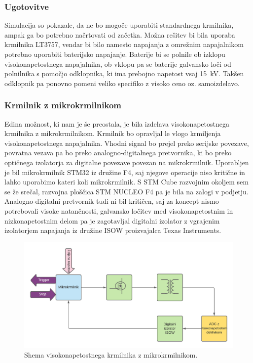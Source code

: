 \documentclass[a4paper,twoside,openright,12pt,Slovene]{book}
\begin{document}
    \subsubsection{Ugotovitve} \label{Ugotovitve glede komercialnih krmilnkov}
Simulacija so pokazale, da ne bo mogoče uporabiti standardnega krmilnika, ampak ga bo potrebno načrtovati od začetka. Možna rešitev bi bila uporaba krmilnika LT3757, vendar bi bilo namesto napajanja z omrežnim napajalnikom potrebno uporabiti baterijsko napajanje. Baterije bi se polnile ob izklopu visokonapetostnega napajalnika, ob vklopu pa se baterije galvansko loči od polnilnika s pomočjo odklopnika,  ki ima prebojno napetost vsaj \SI{15}{\kilo\volt}. Takšen odklopnik pa ponovno pomeni veliko specifiko z visoko ceno oz. samoizdelavo. 

	\subsubsection{Krmilnik z mikrokrmilnikom} \label{KrmilnikzUc}
Edina možnost, ki nam je še preostala, je bila izdelava visokonapetostnega krmilnika z mikrokrmilnikom. Krmilnik bo opravljal le vlogo krmiljenja visokonapetostnega napajalnika. Vhodni signal bo prejel preko serijske povezave, povratna vezava pa bo preko analogno-digitalnega pretvornika, ki bo preko optičnega izolatorja za digitalne povezave povezan na mikrokrmilnik. Uporabljen je bil mikrokrmilnik STM32 iz družine F4, saj njegove operacije niso kritične in lahko uporabimo kateri koli mikrokrmilnik. S STM Cube razvojnim okoljem sem se že srečal, razvojna ploščica STM NUCLEO F4 pa je bila na zalogi v podjetju. Analogno-digitalni pretvornik tudi ni bil kritičen, saj za koncept nismo potrebovali visoke natančnosti, galvansko ločitev med visokonapetostnim in nizkonapetostnim delom pa je zagotavljal digitalni izolator z vgrajenim izolatorjem napajanja iz družine ISOW proizvajalca Texas Instruments. 

	\begin{figure}[H]
    \centering
    \includegraphics[width=1\columnwidth]{Sheme/KrmilnikzuCElShema.pdf}
    \caption{\label{KrmilnikzuCElShema} Shema visokonapetostnega krmilnika z mikrokrmilnikom.}
	\end{figure}
\end{document}
